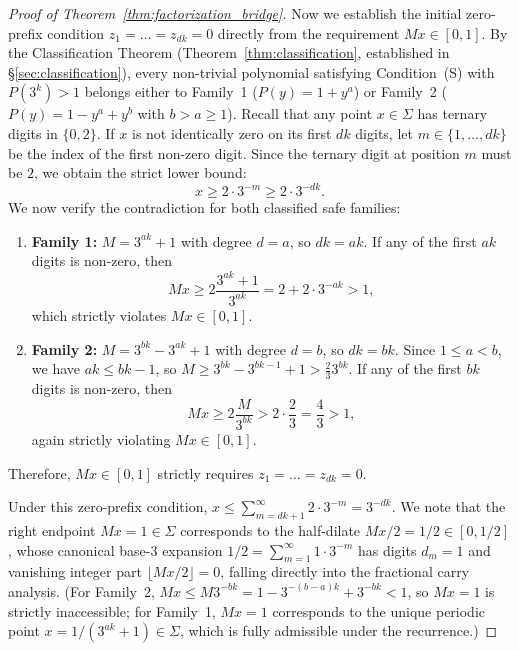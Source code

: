 \documentclass[11pt,reqno]{amsart}
\theoremstyle{plain}
\theoremstyle{definition}
\theoremstyle{remark}
\begin{document}
\begin{proof}[Proof of Theorem~\ref{thm:factorization_bridge}]
Now we establish the initial zero-prefix condition $z_1 = \dots = z_{dk} = 0$ directly from the requirement $M x \in [0, 1]$.
By the Classification Theorem (Theorem~\ref{thm:classification}, established in \S\ref{sec:classification}), every non-trivial polynomial satisfying Condition~(S) with $P(3^k) > 1$ belongs either to Family~1 ($P(y) = 1 + y^a$) or Family~2 ($P(y) = 1 - y^a + y^b$ with $b > a \ge 1$).
Recall that any point $x \in \Sigma$ has ternary digits in $\{0, 2\}$. If $x$ is not identically zero on its first $dk$ digits, let $m \in \{1, \dots, dk\}$ be the index of the first non-zero digit. Since the ternary digit at position $m$ must be $2$, we obtain the strict lower bound:
\begin{equation}
x \ge 2 \cdot 3^{-m} \ge 2 \cdot 3^{-dk}.
\end{equation}
We now verify the contradiction for both classified safe families:
\begin{enumerate}
    \item \textbf{Family 1:} $M = 3^{ak} + 1$ with degree $d = a$, so $dk = ak$. If any of the first $ak$ digits is non-zero, then
    \begin{equation}
    M x \ge 2 \frac{3^{ak} + 1}{3^{ak}} = 2 + 2 \cdot 3^{-ak} > 1,
    \end{equation}
    which strictly violates $M x \in [0, 1]$.
    \item \textbf{Family 2:} $M = 3^{bk} - 3^{ak} + 1$ with degree $d = b$, so $dk = bk$. Since $1 \le a < b$, we have $ak \le bk - 1$, so $M \ge 3^{bk} - 3^{bk-1} + 1 > \frac{2}{3} 3^{bk}$. If any of the first $bk$ digits is non-zero, then
    \begin{equation}
    M x \ge 2 \frac{M}{3^{bk}} > 2 \cdot \frac{2}{3} = \frac{4}{3} > 1,
    \end{equation}
    again strictly violating $M x \in [0, 1]$.
\end{enumerate}
Therefore, $M x \in [0, 1]$ strictly requires $z_1 = \dots = z_{dk} = 0$.

Under this zero-prefix condition, $x \le \sum_{m=dk+1}^\infty 2 \cdot 3^{-m} = 3^{-dk}$. We note that the right endpoint $M x = 1 \in \Sigma$ corresponds to the half-dilate $M x / 2 = 1/2 \in [0, 1/2]$, whose canonical base-$3$ expansion $1/2 = \sum_{m=1}^\infty 1 \cdot 3^{-m}$ has digits $d_m = 1$ and vanishing integer part $\lfloor M x / 2 \rfloor = 0$, falling directly into the fractional carry analysis. (For Family~2, $M x \le M 3^{-bk} = 1 - 3^{-(b-a)k} + 3^{-bk} < 1$, so $M x = 1$ is strictly inaccessible; for Family~1, $M x = 1$ corresponds to the unique periodic point $x = 1/(3^{ak}+1) \in \Sigma$, which is fully admissible under the recurrence.)


\end{proof}
\end{document}
